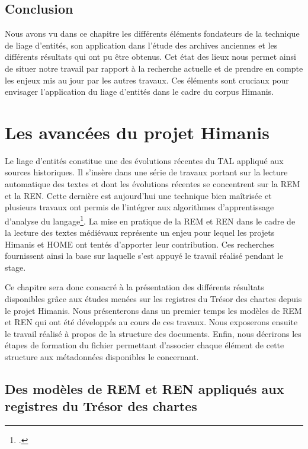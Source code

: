\documentclass[a4paper,12pt,twoside]{book}
\begin{document}
	\section*{Conclusion}
	
	Nous avons vu dans ce chapitre les différents éléments fondateurs de la technique de liage d'entités, son application dans l'étude des archives anciennes et les différents résultats qui ont pu être obtenus. Cet état des lieux nous permet ainsi de situer notre travail par rapport à la recherche actuelle et de prendre en compte les enjeux mis au jour par les autres travaux. Ces éléments sont cruciaux pour envisager l'application du liage d'entités dans le cadre du corpus Himanis.
	
	\chapter{Les avancées du projet Himanis}
	
	Le liage d'entités constitue une des évolutions récentes du TAL appliqué aux sources historiques. Il s'insère dans une série de travaux portant sur la lecture automatique des textes et dont les évolutions récentes se concentrent sur la REM et la REN. Cette dernière est aujourd'hui une technique bien maîtrisée et plusieurs travaux ont permis de l'intégrer aux algorithmes d'apprentissage d'analyse du langage\footcite{suarez_establishing_2020}. La mise en pratique de la REM et REN dans le cadre de la lecture des textes médiévaux représente un enjeu pour lequel les projets Himanis et HOME ont tentés d'apporter leur contribution. Ces recherches fournissent ainsi la base sur laquelle s'est appuyé le travail réalisé pendant le stage.
	
	Ce chapitre sera donc consacré à la présentation des différents résultats disponibles grâce aux études menées sur les registres du Trésor des chartes depuis le projet Himanis. Nous présenterons dans un premier temps les modèles de REM et REN qui ont été développés au cours de ces travaux. Nous exposerons ensuite le travail réalisé à propos de la structure des documents. Enfin, nous décrirons les étapes de formation du fichier permettant d'associer chaque élément de cette structure aux métadonnées disponibles le concernant.
		
	\section{Des modèles de REM et REN appliqués aux registres du Trésor des chartes}
	
\end{document}
